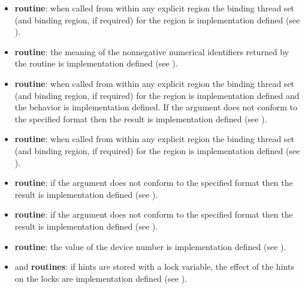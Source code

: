 \begin{itemize}
\item {} \textbf{routine}: when called from within any explicit
 region the binding thread set (and binding region, if required) for the
 region is implementation defined (see
).

\item {} \textbf{routine}: the meaning of the
nonnegative numerical identifiers returned by the
 routine is implementation defined (see
).

\item {} \textbf{routine}: when called from within any explicit
 region the binding thread set (and binding region, if required) for the
 region is implementation defined and the
behavior is implementation defined. If the argument does not
conform to the specified format then the result is implementation defined (see
).

\item {} \textbf{routine}: when called from within any explicit
 region the binding thread set (and binding region, if required) for the
 region is implementation defined (see
).

\item {} \textbf{routine}:  if the argument does not
conform to the specified format then the result is implementation defined (see
).

\item {} \textbf{routine}:  if the  argument does not
conform to the specified format then the result is implementation defined (see
).

\item {} \textbf{routine}: the value of
  the device number is implementation defined (see ).

\item {} and  \textbf{routines}:
if hints are stored with a lock variable, the effect of the hints on the locks are implementation defined
(see ).


\end{itemize}
